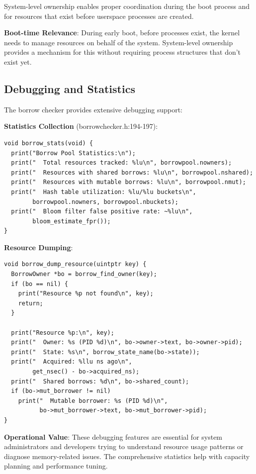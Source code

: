 \documentclass[11pt,letterpaper]{article}
\begin{document}
System-level ownership enables proper coordination during the boot process and for resources that exist before userspace processes are created.

\textbf{Boot-time Relevance}: During early boot, before processes exist, the kernel needs to manage resources on behalf of the system. System-level ownership provides a mechanism for this without requiring process structures that don't exist yet.

\subsection{Debugging and Statistics}

The borrow checker provides extensive debugging support:

\textbf{Statistics Collection} (borrowchecker.h:194-197):

\begin{lstlisting}
void borrow_stats(void) {
  print("Borrow Pool Statistics:\n");
  print("  Total resources tracked: %lu\n", borrowpool.nowners);
  print("  Resources with shared borrows: %lu\n", borrowpool.nshared);
  print("  Resources with mutable borrows: %lu\n", borrowpool.nmut);
  print("  Hash table utilization: %lu/%lu buckets\n", 
        borrowpool.nowners, borrowpool.nbuckets);
  print("  Bloom filter false positive rate: ~%lu\n", 
        bloom_estimate_fpr());
}
\end{lstlisting}

\textbf{Resource Dumping}:

\begin{lstlisting}
void borrow_dump_resource(uintptr key) {
  BorrowOwner *bo = borrow_find_owner(key);
  if (bo == nil) {
    print("Resource %p not found\n", key);
    return;
  }
  
  print("Resource %p:\n", key);
  print("  Owner: %s (PID %d)\n", bo->owner->text, bo->owner->pid);
  print("  State: %s\n", borrow_state_name(bo->state));
  print("  Acquired: %llu ns ago\n", 
        get_nsec() - bo->acquired_ns);
  print("  Shared borrows: %d\n", bo->shared_count);
  if (bo->mut_borrower != nil)
    print("  Mutable borrower: %s (PID %d)\n", 
          bo->mut_borrower->text, bo->mut_borrower->pid);
}
\end{lstlisting}

\textbf{Operational Value}: These debugging features are essential for system administrators and developers trying to understand resource usage patterns or diagnose memory-related issues. The comprehensive statistics help with capacity planning and performance tuning.
\end{document}
